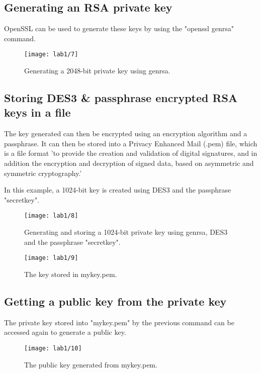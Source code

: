 \subsection{Generating an RSA private key}\label{subsec:rsa-private-key}
OpenSSL can be used to generate these keys by using the "openssl genrsa" command.

\begin{figure}[H]
    \centering
    \texttt{[image: lab1/7]}
    \caption{Generating a 2048-bit private key using genrsa.}
    \label{fig:genrsa}
\end{figure}

\pagebreak

\subsection{Storing DES3 \& passphrase encrypted RSA keys in a file}\label{subsec:storing-keys-in-file}
The key generated can then be encrypted using an encryption algorithm and a passphrase.
It can then be stored into a Privacy Enhanced Mail (.pem) file, which is
a file format 'to provide the creation and validation of digital signatures, and in addition the
encryption and decryption of signed data, based on asymmetric and symmetric cryptography.'
~\autocite[p. 1894]{PEMFormat}

In this example, a 1024-bit key is created using DES3 and the passphrase "secretkey".

\begin{figure}[H]
    \centering
    \texttt{[image: lab1/8]}
    \caption{Generating and storing a 1024-bit private key using genrsa, DES3 and the passphrase "secretkey".}
    \label{fig:DES3Key}
\end{figure}

\begin{figure}[H]
    \centering
    \texttt{[image: lab1/9]}
    \caption{The key stored in mykey.pem.}
    \label{fig:mykey}
\end{figure}

\subsection{Getting a public key from the private key}\label{subsec:PubFromPriv}
The private key stored into "mykey.pem" by the previous command can be accessed again to generate a public key.

\begin{figure}[H]
    \centering
    \texttt{[image: lab1/10]}
    \caption{The public key generated from mykey.pem.}
    \label{fig:pubKey}
\end{figure}

